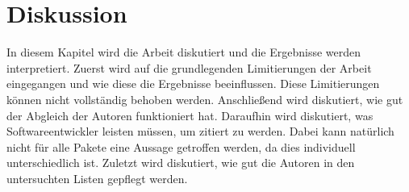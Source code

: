 


\chapter{Diskussion}
\label{chap:diskussion}
In diesem Kapitel wird die Arbeit diskutiert und die Ergebnisse werden interpretiert.
Zuerst wird auf die grundlegenden Limitierungen der Arbeit eingegangen und wie diese die Ergebnisse beeinflussen.
Diese Limitierungen können nicht vollständig behoben werden.
Anschließend wird diskutiert, wie gut der Abgleich der Autoren funktioniert hat.
Daraufhin wird diskutiert, was Softwareentwickler leisten müssen, um zitiert zu werden.
Dabei kann natürlich nicht für alle Pakete eine Aussage getroffen werden, da dies individuell unterschiedlich ist.
Zuletzt wird diskutiert, wie gut die Autoren in den untersuchten Listen gepflegt werden.

